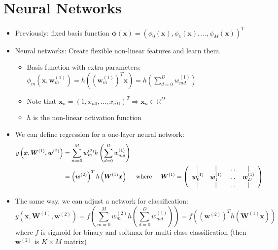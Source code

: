 \section{Neural Networks}
\begin{itemize}
	\item Previously: fixed basis function $\bm{\phi}(\bm{x}) = \left(\phi_0\left(\bm{x}\right), \phi_1\left(\bm{x}\right), ..., \phi_M\left(\bm{x}\right)\right)^T$
	\item Neural networks: Create flexible non-linear features and learn them. 
	\begin{itemize}
		\item Basis function with extra parameters: $\phi_m\left(\bm{x},\bm{w}_m^{(1)}\right) = h\left(\left(\bm{w}_m^{(1)}\right)^T \bm{x}\right) = h\left(\sum\limits_{d=0}^{D}w_{md}^{(1)}\right)$ 
		\item Note that $\bm{x}_n = \left(1, x_{n0},...,x_{nD}\right)^T\Rightarrow \bm{x}_n \in \mathbb{R}^D$
		\item $h$ is the non-linear activation function
	\end{itemize}
	\item We can define regression for a one-layer neural network:
	\begin{equation*}
		\begin{split}
			y\left(\bm{x}, \bm{W}^{(1)}, \bm{w}^{(2)}\right) & = \sum\limits_{m=0}^{M} w_m^{(2)} h\left(\sum\limits_{d=0}^{D}w_{md}^{(1)}\right) \\
			& = \left(\bm{w}^{(2)}\right)^T h\left(\bm{W}^{(1)} \bm{x}\right) \text{\hspace{5mm}where\hspace{5mm}} \bm{W}^{(1)} = \left(\begin{array}{cccc}
			\mid & \mid & \dots & \mid\\
			\bm{w}_0^{(1)} & \bm{w}_1^{(1)} & \dots & \bm{w}_D^{(1)}\\
			\mid & \mid & \dots & \mid
			\end{array}\right)\\
		\end{split}
	\end{equation*}
	\item The same way, we can adjust a network for classification:
	$$y\left(\bm{x}, \bm{W}^{(1)}, \bm{w}^{(2)}\right) = f\left(\sum\limits_{m=0}^{M} w_m^{(2)} h\left(\sum\limits_{d=0}^{D}w_{md}^{(1)}\right)\right) = f\left(\left(\bm{w}^{(2)}\right)^T h\left(\bm{W}^{(1)} \bm{x}\right)\right)$$
	where $f$ is sigmoid for binary and softmax for multi-class classification (then $\bm{w}^{(2)}$ is $K\times M$ matrix)
\end{itemize}
